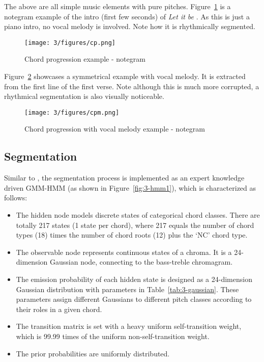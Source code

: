 The above are all simple music elements with pure pitches. Figure~\ref{fig:3-cp} is a notegram example of the intro (first few seconds) of {\it Let it be} . As this is just a piano intro, no vocal melody is involved. Note how it is rhythmically segmented.
\begin{figure}
\centering
\texttt{[image: 3/figures/cp.png]}
\caption{Chord progression example - notegram}
\label{fig:3-cp}
\end{figure}
Figure~\ref{fig:3-cpm} showcases a symmetrical example with vocal melody. It is extracted from the first line of the first verse. Note although this is much more corrupted, a rhythmical segmentation is also visually noticeable.
\begin{figure}
\centering
\texttt{[image: 3/figures/cpm.png]}
\caption{Chord progression with vocal melody example - notegram}
\label{fig:3-cpm}
\end{figure}

\newpage
\subsection{Segmentation} \label{sec:3-sg}
Similar to \cite{cannam2013mirex}, the segmentation process is implemented as an expert knowledge driven GMM-HMM (as shown in Figure~\ref{fig:3-hmm1}), which is characterized as follows:
\begin{itemize}
\item The hidden node models discrete states of categorical chord classes. There are totally 217 states (1 state per chord), where 217 equals the number of chord types (18) times the number of chord roots (12) plus the `NC' chord type.
\item The observable node represents continuous states of a chroma. It is a 24-dimension Gaussian node, connecting to the bass-treble chromagram.
\item The emission probability of each hidden state is designed as a 24-dimension Gaussian distribution with parameters in Table~\ref{tab:3-gaussian}. These parameters assign different Gaussians to different pitch classes according to their roles in a given chord.
\item The transition matrix is set with a heavy uniform self-transition weight, which is 99.99 times of the uniform non-self-transition weight. 
\item The prior probabilities are uniformly distributed.
\end{itemize}

